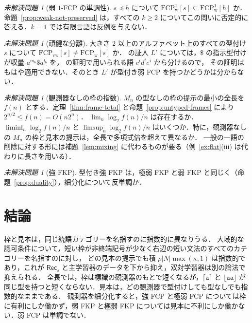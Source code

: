 \documentclass[11pt,a4paper]{ltjsarticle}
\numberwithin{equation}{section}
\theoremstyle{plain}
\theoremstyle{definition}
\theoremstyle{remark}
\newtheorem{openproblem}[theorem]{未解決問題}
\theoremstyle{plain}
\newcommand{\tFCP}[3]{\mathrm{FCP}^{#1}_{\mathrm{#2}}[#3]}
\newcommand{\Lfl}{\lfloor}
\newcommand{\Rfl}{\rfloor}
\newcommand{\Lce}{\lceil}
\newcommand{\Rce}{\rceil}
\newcommand{\ta}{\mathtt a}
\begin{document}
\begin{openproblem}[弱 $1$-FCP の単調性]\label{op:weak-fcp}
$s\preceq h$ について $\tFCP1{w}{s}\subseteq\tFCP1{w}{h}$ か．
命題~\ref{prop:weak-not-preserved} は，すべての $k\ge2$ についてこの問いに否定的に答える．$k=1$ では有限言語は反例を与えない．
\end{openproblem}

\begin{openproblem}[頑健な分離]\label{op:robust}
大きさ 2 以上のアルファベット上のすべての型付け $s$ について $\tFCP{}{vw}{s}\ne\tFCP{}{w}{s}$ か．
\citet[Thm.~14]{ky2017} の証人 $L'$ については，$\$$ の指示型付けが収量 $a^{m_6}\$a^{l_6}$ を，\citet[Lemma~13]{ky2017} の証明で用いられる語 $c^id^ie^i$ から分けるので，
その証明はもはや適用できない．そのとき $L'$ が型付き弱 FCP を持つかどうかは分からない．
\end{openproblem}

\begin{openproblem}[観測器なしの枠の指数]\label{op:frame-exponent}
$M_n$ の型なしの枠の提示の最小の全長を $f(n)$ とする．定理~\ref{thm:frame-total} と命題~\ref{prop:untyped-frames} により $2^{n/2}\le f(n)=O(n2^n)$．
$\lim_n\log_2f(n)/n$ は存在するか．$\liminf_n\log_2f(n)/n$ と $\limsup_n\log_2f(n)/n$ はいくつか．特に，観測器なしの $M_n$ の枠と見本の提示は，全長で多項式倍を超えて異なるか．
一般の一語の削除に対する形には補題~\ref{lem:mixing} に代わるものが要る（例~\ref{ex:flat}(iii) は代わりに長さを用いる）．
\end{openproblem}

\begin{openproblem}[強 FKP]\label{op:further}
型付き強 FKP は，極弱 FKP と弱 FKP と同じく（命題~\ref{prop:duality}），細分化について反単調か．
\end{openproblem}

\section{結論}\label{sec:conclusion}
枠と見本は，同じ統語カテゴリーを名指すのに指数的に異なりうる．
大域的な認可条件について，短い枠が非終端記号が少なく右辺の短い文法のすべてのカテゴリーを名指すのに対し，
どの見本の提示でも積 $\rho|N|\max(\kappa,1)$ は指数的であり，これが $\mathsf{Rec}_s$ と主学習器のデータを下から抑え，双対学習器は別の論法で抑えられる．
全長では，枠は標識の観測器のもとで短くなるが，$\Lce\ta\Rce$ と $\Lfl\ta\ta\Rfl$ が同じ型を持つと短くならない．見本は，どの観測器で型付けしても型なしでも指数的なままである．
観測器を細分化すると，強 FCP と極弱 FCP については枠に有利にしか働かず，弱 FKP と極弱 FKP については見本に不利にしか働かない．弱 FCP は単調でない．
\end{document}
